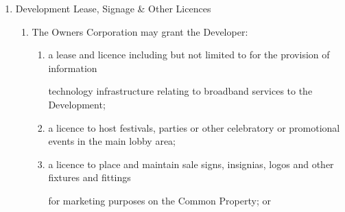 \documentclass{article}
\begin{document}
\begin{enumerate}[label=\arabic*.]
\begin{enumerate}[label=\arabic{enumi}.\arabic*.]
\begin{enumerate}[label=(\arabic*)]
\begin{enumerate}[label=(\alph*)]
{\fontsize{10.02}{1}controlled by the Developer, the Developer must: }

{\fontsize{9.962}{1}(i) give the Owners Corporation details of the Developer’s Signs, including their proposed }

{\fontsize{10.02}{1}location; }

{\fontsize{9.962}{1}(ii) pays all costs for erecting the Developer’s Signs; }

{\fontsize{9.962}{1}(iii) does not damage the Common Property or the structural or functional integrity of any }

{\fontsize{10.02}{1}Lot or any building or improvement on any part of the Common Property; and }

{\fontsize{9.962}{1}(iv) repairs any damage to the Common Property caused by the Developer. }

\end{enumerate}
\item {\fontsize{9.962}{1} An Owner or Occupier of a Lot must not hinder or impede the Developer from exercising their rights }

{\fontsize{10.02}{1}under any agreement entered into under this Rule. }

\end{enumerate}
\item {\fontsize{9.99}{1} Development Lease, Signage \& Other Licences }

\begin{enumerate}[label=(\arabic*)]
\item {\fontsize{9.962}{1} The Owners Corporation may grant the Developer: }

\begin{enumerate}[label=(\alph*)]
\item {\fontsize{9.962}{1} a lease and licence including but not limited to for the provision of information }

{\fontsize{10.02}{1}technology infrastructure relating to broadband services to the Development; }

\item {\fontsize{9.962}{1} a licence to host festivals, parties or other celebratory or promotional events in the main lobby area; }

\item {\fontsize{9.962}{1} a licence to place and maintain sale signs, insignias, logos and other fixtures and fittings }

{\fontsize{10.02}{1}for marketing purposes on the Common Property; or }


\end{enumerate}
\end{enumerate}
\end{enumerate}
\end{enumerate}
\end{document}
